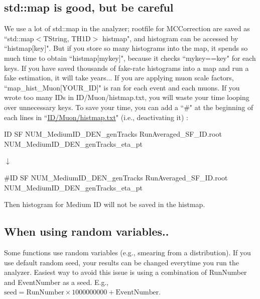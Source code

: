 \documentclass[12pt, a4paper, titlepage]{article}
\begin{document}
\subsection{std::map is good, but be careful}

We use a lot of std::map in the analyzer; rootfile for MCCorrection are saved as ``std::map$<$TString, TH1D$>$ histmap",
and histogram can be accessed by ``histmap$[$key$]$".
But if you store so many histograms into the map, it spends so much time to obtain ``histmap$[$mykey$]$",
because it checks ``mykey==key" for each keys.
If you have saved thousands of fake-rate histograms into a map and run a fake estimation, it will take years...
If you are applying muon scale factors,
``map\_hist\_Muon$[$YOUR\_ID$]$" is ran for each event and each muons.
If you wrote too many IDs in ID/Muon/histmap.txt, you will waste your time looping over unnecessary keys.
To save your time, you can add a ``\#" at the beginning of each lines in ``\href{https://github.com/CMSSNU/SKFlatAnalyzer/blob/Run2Legacy\_v1\_\_190123/data/Run2Legacy\_v1/2016/ID/Muon/histmap.txt}{ID/Muon/histmap.txt}" (i.e., deactivating it) : \\
\centerline{ID SF NUM\_MediumID\_DEN\_genTracks RunAveraged\_SF\_ID.root NUM\_MediumID\_DEN\_genTracks\_eta\_pt}
\centerline{$\downarrow$}
\centerline{\#ID SF NUM\_MediumID\_DEN\_genTracks RunAveraged\_SF\_ID.root NUM\_MediumID\_DEN\_genTracks\_eta\_pt}
Then histogram for Medium ID will not be saved in the histmap.

\subsection{When using random variables..}

Some functions use random variables (e.g., smearing from a distribution).
If you use default random seed, your results can be changed everytime you run the analyzer.
Easiest way to avoid this issue is using a combination of RunNumber and EventNumber as a seed.
E.g., $\text{seed} = \text{RunNumber} \times 1000000000 + \text{EventNumber}$.
\end{document}
